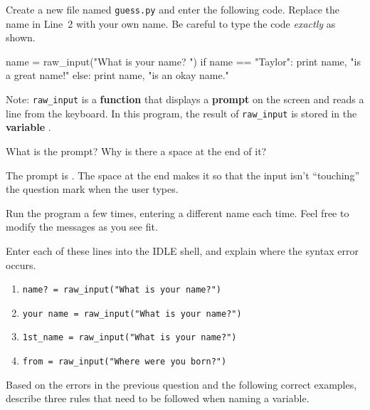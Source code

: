 
Create a new file named \texttt{guess.py} and enter the following code.
Replace the name in Line~2 with your own name.
Be careful to type the code \emph{exactly} as shown.

\begin{pythbox}
name = raw_input("What is your name? ")
if name == "Taylor":
    print name, "is a great name!"
else:
    print name, "is an okay name."
\end{pythbox}

Note: \verb|raw_input| is a \textbf{function} that displays a \textbf{prompt} on the screen and reads a line from the keyboard.
In this program, the result of \verb|raw_input| is stored in the \textbf{variable} .




\Q What is the prompt? Why is there a space at the end of it?

\begin{answer}
The prompt is .
The space at the end makes it so that the input isn't ``touching'' the question mark when the user types.
\end{answer}


\Q Run the program a few times, entering a different name each time. Feel free to modify the messages as you see fit.

\vspace{1em}


\Q Enter each of these lines into the IDLE shell, and explain where the syntax error occurs.

\begin{enumerate}
\item \verb|name? = raw_input("What is your name?")|

\item \verb|your name = raw_input("What is your name?")|

\item \verb|1st_name = raw_input("What is your name?")|

\item \verb|from = raw_input("Where were you born?")|
\end{enumerate}


\Q Based on the errors in the previous question and the following correct examples, describe three rules that need to be followed when naming a variable.

